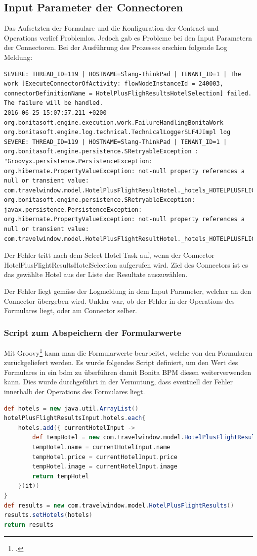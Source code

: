 \subsection{Input Parameter der Connectoren}
Das Aufsetzten der Formulare und die Konfiguration der Contract und Operations verlief Problemlos. Jedoch gab es Probleme bei den Input Parametern der Connectoren. Bei der Ausführung des Prozesses erschien folgende Log Meldung:

\begin{lstlisting}[firstnumber=1]
SEVERE: THREAD_ID=119 | HOSTNAME=Slang-ThinkPad | TENANT_ID=1 | The work [ExecuteConnectorOfActivity: flowNodeInstanceId = 240003, connectorDefinitionName = HotelPlusFlighResultsHotelSelection] failed. The failure will be handled.
2016-06-25 15:07:57.211 +0200 org.bonitasoft.engine.execution.work.FailureHandlingBonitaWork org.bonitasoft.engine.log.technical.TechnicalLoggerSLF4JImpl log 
SEVERE: THREAD_ID=119 | HOSTNAME=Slang-ThinkPad | TENANT_ID=1 | org.bonitasoft.engine.persistence.SRetryableException : "Groovyx.persistence.PersistenceException: org.hibernate.PropertyValueException: not-null property references a null or transient value: com.travelwindow.model.HotelPlusFlightResultHotel._hotels_HOTELPLUSFLIGHTRESULTS_PIDBackref"
org.bonitasoft.engine.persistence.SRetryableException: javax.persistence.PersistenceException: org.hibernate.PropertyValueException: not-null property references a null or transient value: com.travelwindow.model.HotelPlusFlightResultHotel._hotels_HOTELPLUSFLIGHTRESULTS_PIDBackref
\end{lstlisting}

Der Fehler tritt nach dem Select Hotel Task auf, wenn der Connector HotelPlusFlightResultsHotelSelection aufgerufen wird. Ziel des Connectors ist es das gewählte Hotel aus der Liste der Resultate auszuwählen.

Der Fehler liegt gemäss der Logmeldung in dem Input Parameter, welcher an den Connector übergeben wird.
Unklar war, ob der Fehler in der Operations des Formulares liegt, oder am Connector selber.

\subsubsection{Script zum Abspeichern der Formularwerte}
Mit Groovy\footcite{Groovy_2016-06-25} kann man die Formularwerte bearbeitet, welche von den Formularen zurückgeliefert werden.
Es wurde folgendes Script definiert, um den Wert des Formulares in ein \gls{bdm} zu überführen damit Bonita BPM diesen weiterverwenden kann. Dies wurde durchgeführt in der Vermutung, dass eventuell der Fehler innerhalb der Operations des Formulares liegt.
\begin{lstlisting}[language=Groovy,firstnumber=1]
def hotels = new java.util.ArrayList()
hotelPlusFlightResultsInput.hotels.each{
	hotels.add({ currentHotelInput ->
		def tempHotel = new com.travelwindow.model.HotelPlusFlightResultHotel()
		tempHotel.name = currentHotelInput.name
		tempHotel.price = currentHotelInput.price
		tempHotel.image = currentHotelInput.image
		return tempHotel
	}(it))
}
def results = new com.travelwindow.model.HotelPlusFlightResults()
results.setHotels(hotels)
return results
\end{lstlisting}

